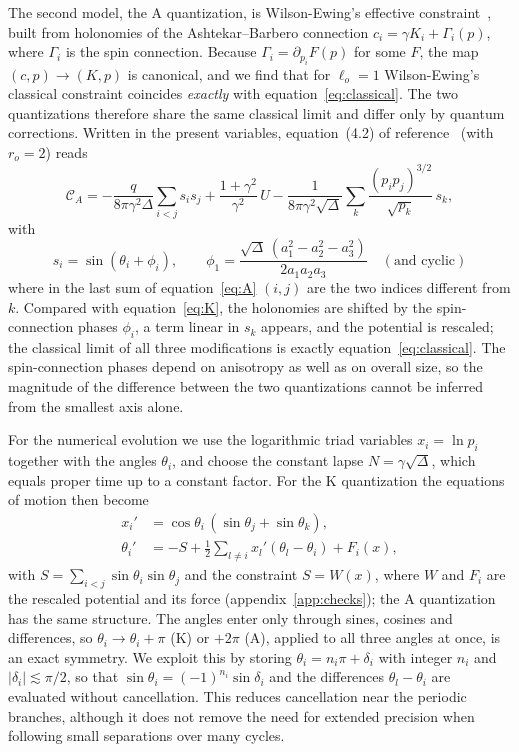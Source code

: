 \documentclass[12pt]{iopjournal}
\begin{document}
The second model, the A quantization, is Wilson-Ewing's effective constraint~\cite{WilsonEwing2010},
built from holonomies of the Ashtekar--Barbero connection $c_i=\gamma K_i+\Gamma_i(p)$, where $\Gamma_i$
is the spin connection. Because $\Gamma_i=\partial_{p_i}F(p)$ for some $F$, the map $(c,p)\to(K,p)$ is
canonical, and we find that for $\ell_o=1$ Wilson-Ewing's classical constraint coincides \emph{exactly}
with equation~\eqref{eq:classical}. The two quantizations therefore share the same classical limit and
differ only by quantum corrections. Written in the present variables, equation~(4.2) of
reference~\cite{WilsonEwing2010} (with $r_o=2$) reads
\begin{equation}
  \mathcal C_A=-\frac{q}{8\pi\gamma^2\Delta}\sum_{i<j}s_is_j+\frac{1+\gamma^2}{\gamma^2}\,U
  -\frac{1}{8\pi\gamma^2\sqrt\Delta}\sum_k\frac{(p_ip_j)^{3/2}}{\sqrt{p_k}}\,s_k,\label{eq:A}
\end{equation}
with
\[
  s_i=\sin(\theta_i+\phi_i),\qquad
  \phi_1=\frac{\sqrt\Delta\,(a_1^2-a_2^2-a_3^2)}{2a_1a_2a_3}\quad(\text{and cyclic})
\]
where in the last sum of equation~\eqref{eq:A} $(i,j)$ are the two indices different from $k$. Compared
with equation~\eqref{eq:K}, the holonomies are shifted by the spin-connection phases $\phi_i$, a term
linear in $s_k$ appears, and the potential is rescaled; the classical limit of all three modifications
is exactly equation~\eqref{eq:classical}. The spin-connection phases depend on anisotropy as well as on
overall size, so the magnitude of the difference between the two quantizations cannot be inferred from
the smallest axis alone.

For the numerical evolution we use the logarithmic triad variables $x_i=\ln p_i$ together with the
angles $\theta_i$, and choose the constant lapse $N=\gamma\sqrt\Delta$, which equals proper time up to a
constant factor. For the K quantization the equations of motion then become
\begin{align}
  x_i'&=\cos\theta_i\,(\sin\theta_j+\sin\theta_k),\nonumber\\
  \theta_i'&=-S+\tfrac12\sum_{l\neq i}x_l'(\theta_l-\theta_i)+F_i(x),
  \label{eq:eom}
\end{align}
with $S=\sum_{i<j}\sin\theta_i\sin\theta_j$ and the constraint $S=W(x)$, where $W$ and $F_i$ are the
rescaled potential and its force (appendix~\ref{app:checks}); the A quantization has the same structure. The
angles enter only through sines, cosines and differences, so $\theta_i\to\theta_i+\pi$ (K) or $+2\pi$ (A),
applied to all three angles at once, is an exact symmetry. We exploit this by storing
$\theta_i=n_i\pi+\delta_i$ with integer $n_i$ and $|\delta_i|\lesssim\pi/2$, so that
$\sin\theta_i=(-1)^{n_i}\sin\delta_i$ and the differences $\theta_l-\theta_i$ are evaluated without
cancellation. This reduces cancellation near the periodic branches, although it does not remove the
need for extended precision when following small separations over many cycles.
\end{document}
